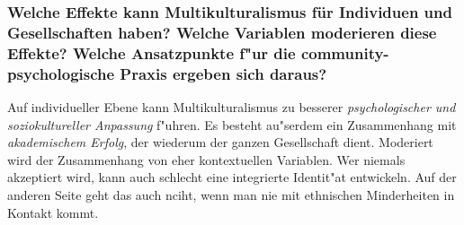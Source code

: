 \subsubsection{Welche Effekte kann Multikulturalismus für Individuen und Gesellschaften haben? Welche Variablen moderieren diese Effekte? Welche Ansatzpunkte f"ur die community-psychologische Praxis ergeben sich daraus?}
Auf individueller Ebene kann Multikulturalismus zu besserer \emph{psychologischer und soziokultureller Anpassung} f"uhren. Es besteht au"serdem ein Zusammenhang mit \emph{akademischem Erfolg}, der wiederum der ganzen Gesellschaft dient. Moderiert wird der Zusammenhang von eher kontextuellen Variablen. Wer niemals akzeptiert wird, kann auch schlecht eine integrierte Identit"at entwickeln. Auf der anderen Seite geht das auch nciht, wenn man nie mit ethnischen Minderheiten in Kontakt kommt.





